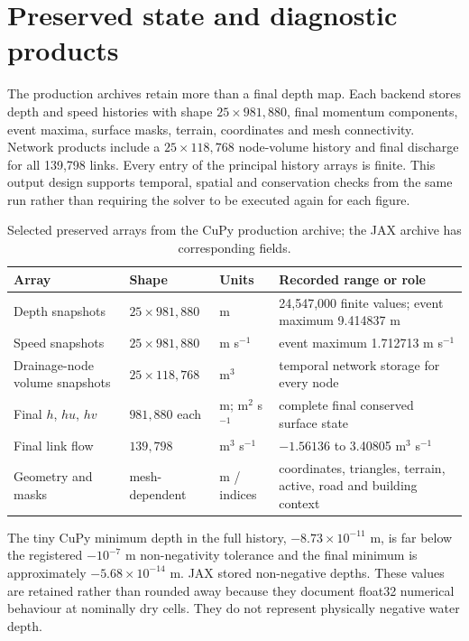 \documentclass[11pt,a4paper,oneside]{report}
\begin{document}
\section{Preserved state and diagnostic products}
The production archives retain more than a final depth map. Each backend stores depth and
speed histories with shape $25\times981{,}880$, final momentum components, event maxima,
surface masks, terrain, coordinates and mesh connectivity. Network products include a
$25\times118{,}768$ node-volume history and final discharge for all 139,798 links. Every
entry of the principal history arrays is finite. This output design supports temporal,
spatial and conservation checks from the same run rather than requiring the solver to be
executed again for each figure.

\begin{table}[H]
\centering
\caption{Selected preserved arrays from the CuPy production archive; the JAX archive has corresponding fields.}
\label{tab:arrays}
\footnotesize
\begin{tabularx}{\textwidth}{|p{}|p{}|p{}|X|}
\hline
\textbf{Array} & \textbf{Shape} & \textbf{Units} & \textbf{Recorded range or role} \\
\hline\hline
Depth snapshots & $25\times981{,}880$ & m & 24,547,000 finite values; event maximum
9.414837 m \\ \hdashline[0.4pt/1.2pt]
Speed snapshots & $25\times981{,}880$ & m s$^{-1}$ & event maximum 1.712713 m s$^{-1}$ \\
\hdashline[0.4pt/1.2pt]
Drainage-node volume snapshots & $25\times118{,}768$ & m$^3$ & temporal network storage
for every node \\ \hdashline[0.4pt/1.2pt]
Final $h$, $hu$, $hv$ & $981{,}880$ each & m; m$^2$ s$^{-1}$ & complete final conserved
surface state \\ \hdashline[0.4pt/1.2pt]
Final link flow & $139{,}798$ & m$^3$ s$^{-1}$ & $-1.56136$ to 3.40805 m$^3$ s$^{-1}$ \\
\hdashline[0.4pt/1.2pt]
Geometry and masks & mesh-dependent & m / indices & coordinates, triangles, terrain,
active, road and building context \\
\hline
\end{tabularx}
\end{table}

The tiny CuPy minimum depth in the full history, $-8.73\times10^{-11}$ m, is far below the
registered $-10^{-7}$ m non-negativity tolerance and the final minimum is approximately
$-5.68\times10^{-14}$ m. JAX stored non-negative depths. These values are retained rather
than rounded away because they document float32 numerical behaviour at nominally dry cells.
They do not represent physically negative water depth.
\end{document}
